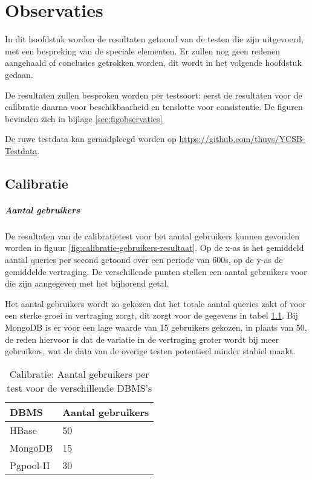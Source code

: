 \chapter{Observaties}
In dit hoofdstuk worden de resultaten getoond van de testen die zijn uitgevoerd, met een bespreking van de speciale elementen. Er zullen nog geen redenen aangehaald of conclusies getrokken worden, dit wordt in het volgende hoofdstuk gedaan. 

De resultaten zullen besproken worden per testsoort: eerst de resultaten voor de calibratie daarna voor beschikbaarheid en tenslotte voor consistentie. De figuren bevinden zich in bijlage \ref{sec:figobservaties}

De ruwe testdata kan geraadpleegd worden op \url{https://github.com/thuys/YCSB-Testdata}. 

\section{Calibratie}

\paragraph{Aantal gebruikers}
De resultaten van de calibratietest voor het aantal gebruikers kunnen gevonden worden in figuur \ref{fig:calibratie-gebruikers-resultaat}. Op de x-as is het gemiddeld aantal queries per second getoond over een periode van 600s, op de y-as de gemiddelde vertraging. De verschillende punten stellen een aantal gebruikers voor die zijn aangegeven met het bijhorend getal. 

Het aantal gebruikers wordt zo gekozen dat het totale aantal queries zakt of voor een sterke groei in vertraging zorgt, dit zorgt voor de gegevens in tabel \ref{table:calibratie-gebruikers-resultaat}. Bij MongoDB is er voor een lage waarde van 15 gebruikers gekozen, in plaats van 50, de reden hiervoor is dat de variatie in de vertraging groter wordt bij meer gebruikers, wat de data van de overige testen potentieel minder stabiel maakt.  

\begin{table}[h!]
	\centering
	\begin{tabular}{l| l }
		\textbf{DBMS} & Aantal gebruikers \\
		\hline
		HBase & 50 \\
		MongoDB & 15\\
		Pgpool-II & 30\\
	\end{tabular}
	\caption{Calibratie: Aantal gebruikers per test voor de verschillende DBMS's}
	\label{table:calibratie-gebruikers-resultaat}
\end{table}

